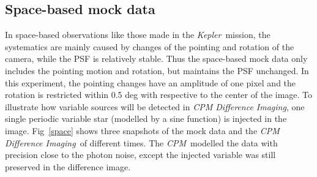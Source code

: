 \documentclass[12pt, preprint]{aastex}
\newcommand{\project}[1]{\textsl{#1}}
\newcommand{\cpm}{\project{CPM}}
\newcommand{\cpmdiff}{\project{CPM Difference Imaging}}
\newcommand{\kepler}{\project{Kepler}}
\begin{document}
\subsection{Space-based mock data}
In space-based observations like those made in the \kepler\ mission, the systematics are mainly caused by changes of the pointing and rotation of the camera, while the PSF is relatively stable. 
Thus the space-based mock data only includes the pointing motion and rotation, but maintains the PSF unchanged.
In this experiment, the pointing changes have an amplitude of one pixel and the rotation is restricted within 0.5 deg with respective to the center of the image.  
To illustrate how variable sources will be detected in \cpmdiff, one single periodic variable star (modelled by a sine function) is injected in the image.
Fig~\ref{space} shows three snapshots of the mock data and the \cpmdiff\ of different times. 
The \cpm\ modelled the data  with precision close to the photon noise, except  the injected variable was still preserved in the difference image.
\end{document}
